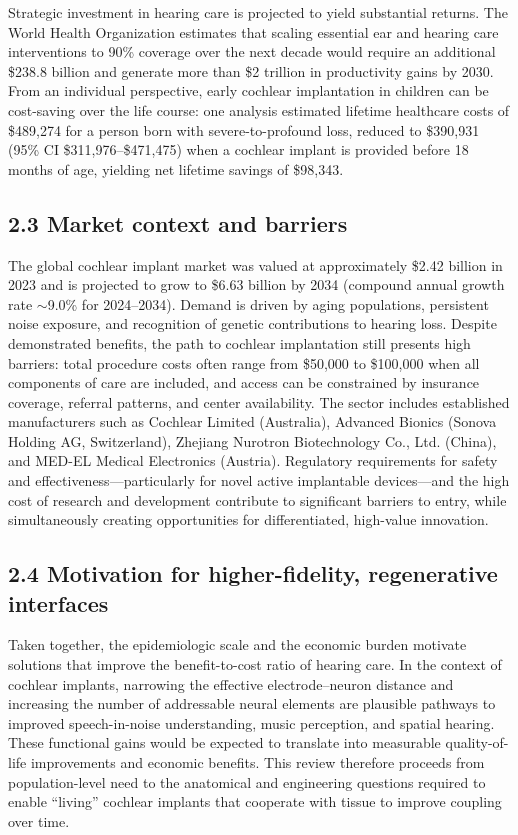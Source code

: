 Strategic investment in hearing care is projected to yield substantial returns. The World Health Organization estimates that scaling essential ear and hearing care interventions to 90\% coverage over the next decade would require an additional \$238.8 billion and generate more than \$2 trillion in productivity gains by 2030.\cite{Tordrup2022} From an individual perspective, early cochlear implantation in children can be cost-saving over the life course: one analysis estimated lifetime healthcare costs of \$489{,}274 for a person born with severe-to-profound loss, reduced to \$390{,}931 (95\% CI \$311{,}976--\$471{,}475) when a cochlear implant is provided before 18 months of age, yielding net lifetime savings of \$98{,}343.\cite{Cejas2024}

\subsection*{2.3 Market context and barriers}
The global cochlear implant market was valued at approximately \$2.42 billion in 2023 and is projected to grow to \$6.63 billion by 2034 (compound annual growth rate \(\sim\)9.0\% for 2024--2034).\cite{globenewswire2025cochlear} Demand is driven by aging populations, persistent noise exposure, and recognition of genetic contributions to hearing loss.\cite{WHO2025} Despite demonstrated benefits, the path to cochlear implantation still presents high barriers: total procedure costs often range from \$50{,}000 to \$100{,}000 when all components of care are included, and access can be constrained by insurance coverage, referral patterns, and center availability. The sector includes established manufacturers such as Cochlear Limited (Australia), Advanced Bionics (Sonova Holding AG, Switzerland), Zhejiang Nurotron Biotechnology Co., Ltd. (China), and MED-EL Medical Electronics (Austria). Regulatory requirements for safety and effectiveness---particularly for novel active implantable devices---and the high cost of research and development contribute to significant barriers to entry, while simultaneously creating opportunities for differentiated, high-value innovation.

\subsection*{2.4 Motivation for higher-fidelity, regenerative interfaces}
Taken together, the epidemiologic scale and the economic burden motivate solutions that improve the benefit-to-cost ratio of hearing care. In the context of cochlear implants, narrowing the effective electrode--neuron distance and increasing the number of addressable neural elements are plausible pathways to improved speech-in-noise understanding, music perception, and spatial hearing. These functional gains would be expected to translate into measurable quality-of-life improvements and economic benefits. This review therefore proceeds from population-level need to the anatomical and engineering questions required to enable ``living'' cochlear implants that cooperate with tissue to improve coupling over time.
